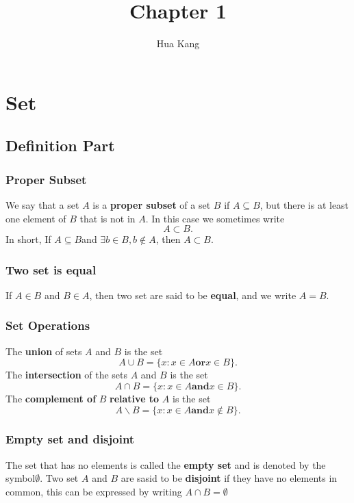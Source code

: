 \documentclass{article}
\title{Chapter 1}
\author{Hua Kang}
\begin{document}
    \maketitle
    \section{Set}
        \subsection{Definition Part}
            \subsubsection{Proper Subset}
                We say that a set $A$ is a \textbf{proper subset} of a set $B$ if $A \subseteq B$, but there is at least one element of $B$ that is not in $A$. In this case we sometimes write
                $$A \subset B.$$
                In short, If $A\subseteq B$and $\exists b \in B , b \notin A$, then $A\subset B$.
            
            \subsubsection{Two set is equal}
                If $A\in B$ and $B\in A$, then two set are said to be \textbf{equal}, and we write $A=B$.
            
            \subsubsection{Set Operations}
                The \textbf{union} of sets $A$ and $B$ is the set
                $$A \cup B =\{x:x\in A \textbf{or} x\in B\} .$$
                The \textbf{intersection} of the sets $A$ and $B$ is the set
                $$ A\cap B =\{x:x\in A \textbf{and}x\in B\}.$$
                The \textbf{complement of} $B$ \textbf{relative to} $A$ is the set
                $$A\backslash B=\{x:x\in A \textbf{and} x \notin B\}.$$

            \subsubsection{Empty set and disjoint}
                The set that has no elements is called the \textbf{empty set} and is denoted by the symbol$\emptyset$. Two set $A$ and $B$ are sasid to be \textbf{disjoint} if they have no elements in common, this can be expressed by writing $A \cap B =\emptyset$
            
\end{document}
